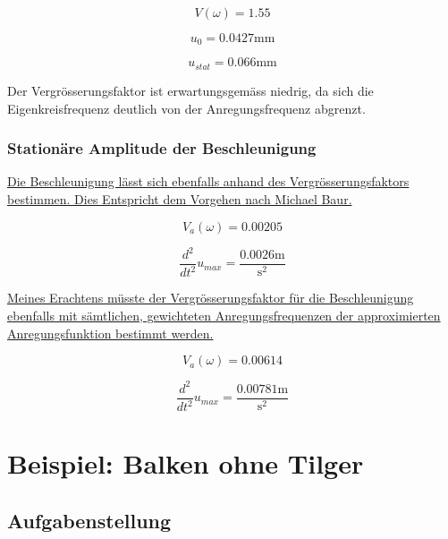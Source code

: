 \documentclass[
  letterpaper,
  DIV=11]{scrreprt}
\begin{document}
\begin{equation}V{\left(\omega \right)} = 1.55\end{equation}

\begin{equation}u_{0} = 0.0427 \text{mm}\end{equation}

\begin{equation}u_{stat} = 0.066 \text{mm}\end{equation}

Der Vergrösserungsfaktor ist erwartungsgemäss niedrig, da sich die
Eigenkreisfrequenz deutlich von der Anregungsfrequenz abgrenzt.

\hypertarget{stationuxe4re-amplitude-der-beschleunigung}{%
\subsection{Stationäre Amplitude der
Beschleunigung}\label{stationuxe4re-amplitude-der-beschleunigung}}

\ul{Die Beschleunigung lässt sich ebenfalls anhand des
Vergrösserungsfaktors bestimmen. Dies Entspricht dem Vorgehen nach
Michael Baur.}

\begin{equation}V_{a}{\left(\omega \right)} = 0.00205\end{equation}

\begin{equation}\frac{d^{2}}{d t^{2}} u_{max} = \frac{0.0026 \text{m}}{\text{s}^{2}}\end{equation}

\ul{Meines Erachtens müsste der Vergrösserungsfaktor für die
Beschleunigung ebenfalls mit sämtlichen, gewichteten Anregungsfrequenzen
der approximierten Anregungsfunktion bestimmt werden.}

\begin{equation}V_{a}{\left(\omega \right)} = 0.00614\end{equation}

\begin{equation}\frac{d^{2}}{d t^{2}} u_{max} = \frac{0.00781 \text{m}}{\text{s}^{2}}\end{equation}

\hypertarget{sec-ems_untilg}{%
\chapter{Beispiel: Balken ohne Tilger}\label{sec-ems_untilg}}

\hypertarget{aufgabenstellung-9}{%
\section{Aufgabenstellung}\label{aufgabenstellung-9}}
\end{document}
